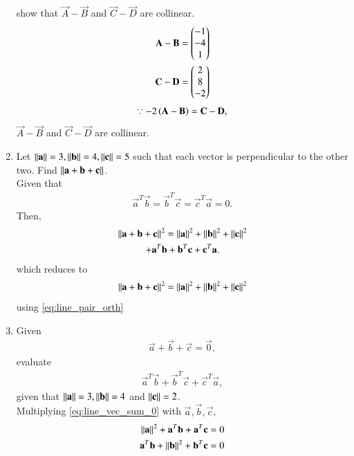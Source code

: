 \begin{enumerate}[label=\arabic*.,ref=\thesubsection.\theenumi]
show that  $\vec{A}-\vec{B}$ and $\vec{C}-\vec{D}$ are collinear.
%
\\
\solution 
%
\begin{align}
\mathbf{A}-\mathbf{B} &= \begin{pmatrix}-1\\-4\\1\end{pmatrix}
\\
\mathbf{C}-\mathbf{D} &= \begin{pmatrix}2\\8\\-2\end{pmatrix}
\end{align}
%
%
\begin{align}
\because -2\left(\mathbf{A}-\mathbf{B}\right) =  \mathbf{C}-\mathbf{D},
\end{align}
%
$\vec{A}-\vec{B}$ and $\vec{C}-\vec{D}$ are collinear.

\item Let $\left\lVert\mathbf{a}\right\rVert = 3, \left\lVert\mathbf{b}\right\rVert= 4, \left\lVert\mathbf{c}\right\rVert = 5$ such that each vector is perpendicular to the other two.  Find $\left\lVert\mathbf{a}+\mathbf{b}+\mathbf{c}\right\rVert$.
%
\\
\solution Given that 
%
\begin{align}
\label{eq:line_pair_orth}
 \vec{a}^T \vec{b} =  \vec{b}^T\vec{c}= \vec{c}^T\vec{a} = 0.
\end{align}
%
Then, 
%
\begin{multline}
\left\lVert\mathbf{a}+\mathbf{b}+\mathbf{c}\right\rVert^2 = \left\lVert\mathbf{a}\right\rVert^2+\left\lVert\mathbf{b}\right\rVert^2+\left\lVert\mathbf{c}\right\rVert^2
\\
+ \mathbf{a}^T \mathbf{b} +  \mathbf{b}^T\mathbf{c}+ \mathbf{c}^T\mathbf{a}.
\end{multline}
%
which reduces to 
%
\begin{align}
\left\lVert\mathbf{a}+\mathbf{b}+\mathbf{c}\right\rVert^2 = \left\lVert\mathbf{a}\right\rVert^2+\left\lVert\mathbf{b}\right\rVert^2+\left\lVert\mathbf{c}\right\rVert^2
\end{align}
%
using \eqref{eq:line_pair_orth}
%
\item Given 
\begin{align}
\label{eq:line_vec_sum_0}
 \vec{a}+\vec{b}+\vec{c} = \vec{0}, 
\end{align}
evaluate 
\begin{align}
 \vec{a}^T\vec{b}+\vec{b}^T\vec{c}+\vec{c}^T\vec{a},
\end{align}
given that $\left\lVert \mathbf{a}\right\rVert=3, \left\lVert \mathbf{b}\right\rVert= 4$ and $\left\lVert \mathbf{c}\right\rVert = 2 $.
%
\\
\solution Multiplying \eqref{eq:line_vec_sum_0} with $\vec{a}, \vec{b}, \vec{c}$,
\begin{align}
\norm{ \vec{a}}^2+\vec{a}^T\vec{b}+\vec{a}^T\vec{c} &= 0
\\
\vec{a}^T\vec{b}+\norm{ \vec{b}}^2+\vec{b}^T\vec{c} &= 0

\end{align}
\end{enumerate}
